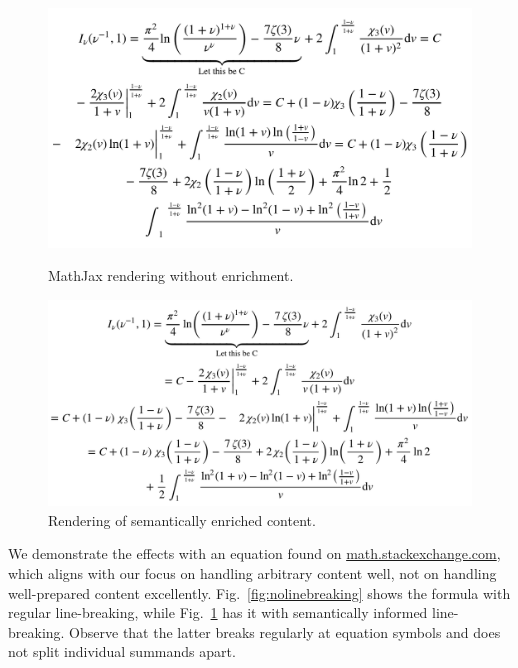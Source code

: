 \documentclass[conference]{IEEEtran}
\begin{document}
\begin{figure}[t]
  \begin{minipage}{.9\columnwidth}
    \centering
    \includegraphics[width=\textwidth]{nolinebreaking}
    \caption{MathJax rendering without enrichment.}
    \label{fig:nolinebreaking}
  \end{minipage}\qquad
  \begin{minipage}{1.05\columnwidth}
    \centering
    \includegraphics[width=\textwidth]{linebreaking}
    \caption{Rendering of semantically enriched content.}
    \label{fig:linebreaking}
  \end{minipage}
  
\end{figure}

We demonstrate the effects with an equation found on
\url{math.stackexchange.com}, which aligns with our focus on handling arbitrary
content well, not on handling well-prepared content excellently.
Fig.~\ref{fig:nolinebreaking} shows the formula with regular line-breaking,
while Fig.~\ref{fig:linebreaking} has it with semantically
informed line-breaking. Observe that the latter breaks regularly at
equation symbols and does not split individual summands apart.
\end{document}
